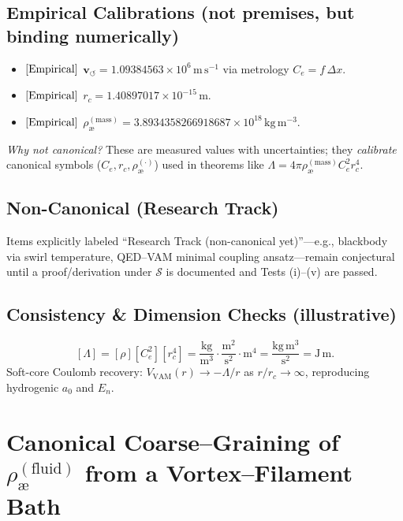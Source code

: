 \documentclass[11pt, a4paper]{article}
\begin{document}
    \subsection*{Empirical Calibrations (not premises, but binding numerically)}
    \begin{itemize}
        \item \([{\rm Empirical}]\) \(\mathbf{v}_{\scriptscriptstyle\boldsymbol{\circlearrowleft}} = 1.09384563\times 10^6\,\mathrm{m\,s^{-1}}\) via metrology \(C_e=f\,\Delta x\).
        \item \([{\rm Empirical}]\) \(r_c = 1.40897017\times 10^{-15}\,\mathrm{m}\).
        \item \([{\rm Empirical}]\) \(\rho_{\text{\ae}}^{(\text{mass})} = 3.8934358266918687\times 10^{18}\,\mathrm{kg\,m^{-3}}\).
    \end{itemize}
    \emph{Why not canonical?} These are measured values with uncertainties; they \emph{calibrate} canonical symbols (\(C_e,r_c,\rho_{\text{\ae}}^{(\cdot)}\)) used in theorems like \(\Lambda=4\pi\rho_{\text{\ae}}^{(\text{mass})}C_e^2 r_c^4\).

    \subsection*{Non-Canonical (Research Track)}
    Items explicitly labeled “Research Track (non-canonical yet)”—e.g., blackbody via swirl temperature, QED–VAM minimal coupling ansatz—remain conjectural until a proof/derivation under \(\mathcal{S}\) is documented and Tests (i)–(v) are passed.

    \subsection*{Consistency & Dimension Checks (illustrative)}
    \[
        [\Lambda]=[\rho][C_e^2][r_c^4]
        =\frac{\mathrm{kg}}{\mathrm{m^3}}\cdot\frac{\mathrm{m^2}}{\mathrm{s^2}}\cdot\mathrm{m^4}
        =\frac{\mathrm{kg\,m^3}}{\mathrm{s^2}}
        =\mathrm{J\,m}.
    \]
    Soft-core Coulomb recovery: \(V_{\text{VAM}}(r)\to -\Lambda/r\) as \(r/r_c\to\infty\), reproducing hydrogenic \(a_0\) and \(E_n\). \cite{Schrodinger1926,Jackson1999}




\section{Canonical Coarse–Graining of \(\rho_{\text{\ae}}^{(\text{fluid})}\) from a Vortex–Filament Bath}
\label{sec:canon_rhoae_from_filaments}
\end{document}
